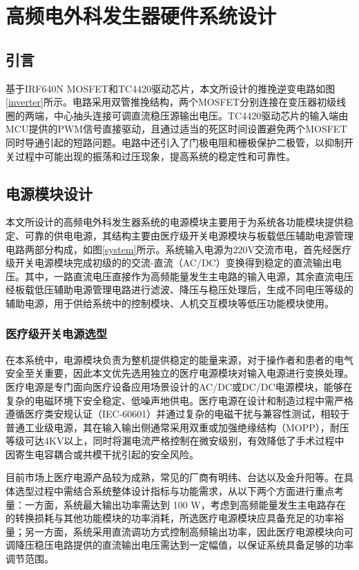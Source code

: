\chapter{高频电外科发生器硬件系统设计}

\section{引言}
基于IRF640N MOSFET和TC4420驱动芯片，本文所设计的推挽逆变电路如图\ref{inverter}所示。电路采用双管推挽结构，两个MOSFET分别连接在变压器初级线圈的两端，中心抽头连接可调直流稳压源输出电压。TC4420驱动芯片的输入端由MCU提供的PWM信号直接驱动，且通过适当的死区时间设置避免两个MOSFET同时导通引起的短路问题。电路中还引入了门极电阻和栅极保护二极管，以抑制开关过程中可能出现的振荡和过压现象，提高系统的稳定性和可靠性。
\section{电源模块设计}
本文所设计的高频电外科发生器系统的电源模块主要用于为系统各功能模块提供稳定、可靠的供电电源，其结构主要由医疗级开关电源模块与板载低压辅助电源管理电路两部分构成，如图\ref{system}所示。系统输入电源为220V交流市电，首先经医疗级开关电源模块完成初级的的交流-直流（AC/DC）变换得到稳定的直流输出电压。其中，一路直流电压直接作为高频能量发生主电路的输入电源，其余直流电压经板载低压辅助电源管理电路进行滤波、降压与稳压处理后，生成不同电压等级的辅助电源，用于供给系统中的控制模块、人机交互模块等低压功能模块使用。

\subsection{医疗级开关电源选型}
在本系统中，电源模块负责为整机提供稳定的能量来源，对于操作者和患者的电气安全至关重要，因此本文优先选用独立的医疗电源模块对输入电源进行变换处理。医疗电源是专门面向医疗设备应用场景设计的AC/DC或DC/DC电源模块，能够在复杂的电磁环境下安全稳定、低噪声地供电。医疗电源在设计和制造过程中需严格遵循医疗类安规认证（IEC-60601）并通过复杂的电磁干扰与兼容性测试，相较于普通工业级电源，其在输入输出侧通常采用双重或加强绝缘结构（MOPP），耐压等级可达4KV以上，同时将漏电流严格控制在微安级别，有效降低了手术过程中因寄生电容耦合或共模干扰引起的安全风险。

目前市场上医疗电源产品较为成熟，常见的厂商有明纬、台达以及金升阳等。在具体选型过程中需结合系统整体设计指标与功能需求，从以下两个方面进行重点考量：一方面，系统最大输出功率需达到 100 W，考虑到高频能量发生主电路存在的转换损耗与其他功能模块的功率消耗，所选医疗电源模块应具备充足的功率裕量；另一方面，系统采用直流调功方式控制高频输出功率，因此医疗电源模块向可调降压稳压电路提供的直流输出电压需达到一定幅值，以保证系统具备足够的功率调节范围。

